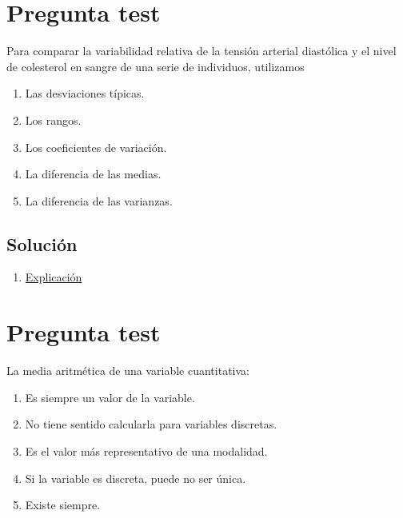 \documentclass[
]{book}
\providecommand{\tightlist}{%
  \setlength{\itemsep}{0pt}\setlength{\parskip}{0pt}}
\begin{document}
\hypertarget{pregunta-test-26}{%
\section{Pregunta test}\label{pregunta-test-26}}

Para comparar la variabilidad relativa de la tensión arterial diastólica y el nivel de colesterol en sangre de una serie de individuos, utilizamos

\begin{enumerate}
\def\labelenumi{\alph{enumi})}
\tightlist
\item
  Las desviaciones típicas.
\item
  Los rangos.
\item
  Los coeficientes de variación.
\item
  La diferencia de las medias.
\item
  La diferencia de las varianzas.
\end{enumerate}

\hypertarget{soluciuxf3n-28}{%
\subsection{Solución}\label{soluciuxf3n-28}}

\begin{enumerate}
\def\labelenumi{\alph{enumi})}
\setcounter{enumi}{2}
\tightlist
\item
  \href{https://1fjmanzano.github.io/bioestadistica/medidas-de-posicio\%CC\%81n-dispersio\%CC\%81n-y-forma.html}{Explicación}
\end{enumerate}

\hypertarget{pregunta-test-27}{%
\section{Pregunta test}\label{pregunta-test-27}}

La media aritmética de una variable cuantitativa:

\begin{enumerate}
\def\labelenumi{\alph{enumi})}
\tightlist
\item
  Es siempre un valor de la variable.
\item
  No tiene sentido calcularla para variables discretas.
\item
  Es el valor más representativo de una modalidad.
\item
  Si la variable es discreta, puede no ser única.
\item
  Existe siempre.
\end{enumerate}
\end{document}
